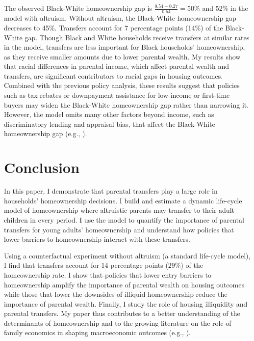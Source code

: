 \documentclass[12pt]{article}
\begin{document}
The observed Black-White homeownership gap is $\frac{0.54 - 0.27}{0.54}=50\%$ and 52\% in the model with altruism. Without altruism, the Black-White homeownership gap decreases to 45\%. Transfers account for 7 percentage points (14\%) of the Black-White gap. Though Black and White households receive transfers at similar rates in the model, transfers are less important for Black households’ homeownership, as they receive smaller amounts due to lower parental wealth. My results show that racial differences in parental income, which affect parental wealth and transfers, are significant contributors to racial gaps in housing outcomes. Combined with the previous policy analysis, these results suggest that policies such as tax rebates or downpayment assistance for low-income or first-time buyers may widen the Black-White homeownership gap rather than narrowing it. However, the model omits many other factors beyond income, such as discriminatory lending and appraisal bias, that affect the Black-White homeownership gap  (e.g.,  \cite{shapiro2004hidden}).

\section{Conclusion}
In this paper, I demonstrate that parental transfers play a large role in households' homeownership decisions. I build and estimate a dynamic life-cycle model of homeownership where altruistic parents may transfer to their adult children in every period. I use the model to quantify the importance of parental transfers for young adults’ homeownership and understand how policies that lower barriers to homeownership interact with these transfers.

Using a counterfactual experiment without altruism (a standard life-cycle model), I find that transfers account for 14 percentage points (29\%) of the homeownership rate. I show that policies that lower entry barriers to homeownership amplify the importance of parental wealth on housing outcomes while those that lower the downsides of illiquid homeownership reduce the importance of parental wealth. Finally, I study the role of housing illiquidity and parental transfers. My paper thus contributes to a better understanding of the determinants of homeownership and to the growing literature on the role of family economics in shaping macroeconomic outcomes (e.g., \cite{Doepke2016a,Daruich2018}).
\end{document}

